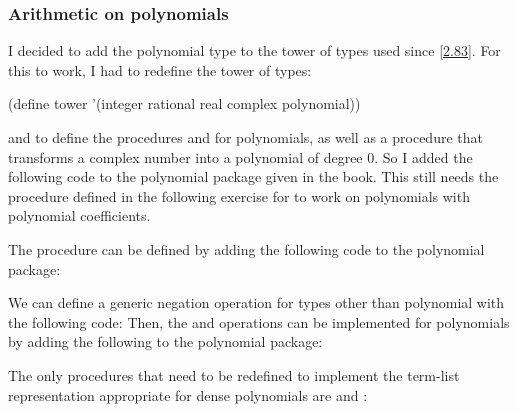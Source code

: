 \subsubsection{Arithmetic on polynomials}

\begin{comp}
    I decided to add the polynomial type to the tower of types used since 
    \autoref{2.83}. For this to work, I had to redefine the tower of types:
    \begin{cscm}
        (define tower '(integer rational real complex polynomial))
    \end{cscm}
    and to define the procedures  and  for polynomials, 
    as well as a  procedure that transforms a complex number into 
    a polynomial of degree 0. So I added the following code to the polynomial 
    package given in the book. This still needs the  procedure 
    defined in the following exercise for  to work on polynomials 
    with polynomial coefficients.
\end{comp}

\begin{exe}[2.87]
    The  procedure can be defined by adding the following code to 
    the polynomial package:
\end{exe}

\begin{exe}[2.88]
    We can define a generic negation operation  for types other than 
    polynomial with the following code:
    Then, the  and  operations can be implemented for 
    polynomials by adding the following to the polynomial package:
\end{exe}

\begin{exe}[2.89]
    The only procedures that need to be redefined to implement the term-list 
    representation appropriate for dense polynomials are  and 
    :
\end{exe}

